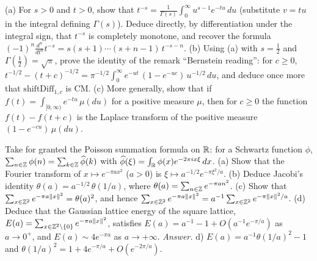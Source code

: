 \begin{exercise}
(a) For $s>0$ and $t>0$, show that $t^{-s}=\frac1{\Gamma(s)}\int_0^\infty u^{s-1}e^{-tu}\,du$ (substitute $v=tu$ in
the integral defining $\Gamma(s)$). Deduce directly, by differentiation under the integral sign, that $t^{-s}$ is
completely monotone, and recover the formula $(-1)^n\frac{d^n}{dt^n}t^{-s}=s(s+1)\cdots(s+n-1)\,t^{-s-n}$.
(b) Using (a) with $s=\frac12$ and $\Gamma(\frac12)=\sqrt\pi$, prove the identity of the remark ``Bernstein reading'':
for $c\ge0$, $t^{-1/2}-(t+c)^{-1/2}=\pi^{-1/2}\int_0^\infty e^{-ut}\,(1-e^{-uc})\,u^{-1/2}\,du$, and deduce once more
that $\mathrm{shiftDiff}_{1,c}$ is CM.
(c) More generally, show that if $f(t)=\int_{[0,\infty)}e^{-tu}\,\mu(du)$ for a positive measure $\mu$, then for $c\ge0$
the function $f(t)-f(t+c)$ is the Laplace transform of the positive measure $(1-e^{-cu})\,\mu(du)$.
\end{exercise}

\begin{exercise}
Take for granted the Poisson summation formula on $\mathbb{R}$: for a Schwartz function $\phi$, $\sum_{n\in\mathbb{Z}}\phi(n)=\sum_{k\in\mathbb{Z}}\widehat\phi(k)$
with $\widehat\phi(\xi)=\int_{\mathbb{R}}\phi(x)e^{-2\pi i x\xi}\,dx$.
(a) Show that the Fourier transform of $x\mapsto e^{-\pi ax^2}$ ($a>0$) is $\xi\mapsto a^{-1/2}e^{-\pi\xi^2/a}$.
(b) Deduce Jacobi's identity $\theta(a)=a^{-1/2}\,\theta(1/a)$, where $\theta(a)=\sum_{n\in\mathbb{Z}}e^{-\pi an^2}$.
(c) Show that $\sum_{x\in\mathbb{Z}^2}e^{-\pi a\|x\|^2}=\theta(a)^2$, and hence
$\sum_{x\in\mathbb{Z}^2}e^{-\pi a\|x\|^2}=a^{-1}\sum_{x\in\mathbb{Z}^2}e^{-\pi\|x\|^2/a}$.
(d) Deduce that the Gaussian lattice energy of the square lattice, $E(a)=\sum_{x\in\mathbb{Z}^2\setminus\{0\}}e^{-\pi a\|x\|^2}$,
satisfies $E(a)=a^{-1}-1+O(a^{-1}e^{-\pi/a})$ as $a\to0^+$, and $E(a)\sim4e^{-\pi a}$ as $a\to+\infty$.
\emph{Answer.} d) $E(a)=a^{-1}\theta(1/a)^2-1$ and $\theta(1/a)^2=1+4e^{-\pi/a}+O(e^{-2\pi/a})$.
\end{exercise}

\label{ch2:fin}
